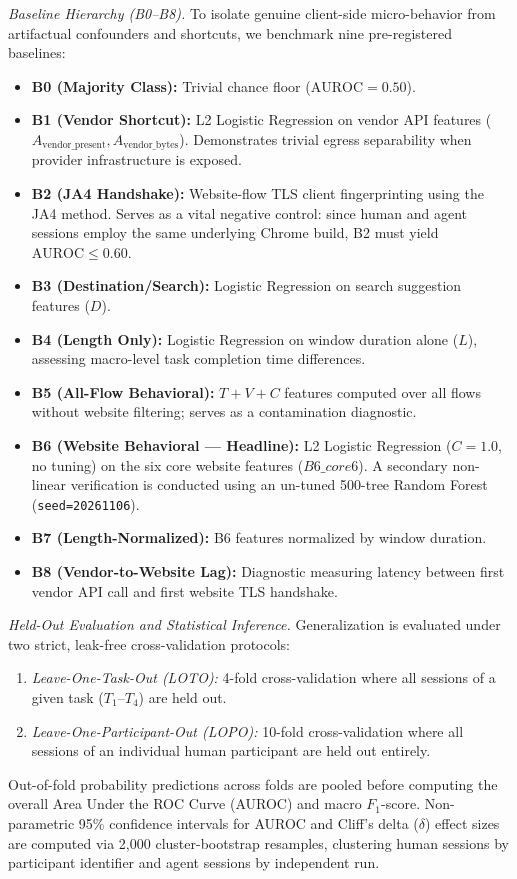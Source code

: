 \textit{Baseline Hierarchy (B0--B8).}
To isolate genuine client-side micro-behavior from artifactual confounders and shortcuts, we benchmark nine pre-registered baselines:
\begin{itemize}
    \item \textbf{B0 (Majority Class):} Trivial chance floor ($\text{AUROC} = 0.50$).
    \item \textbf{B1 (Vendor Shortcut):} L2 Logistic Regression on vendor API features ($A_{\text{vendor\_present}}, A_{\text{vendor\_bytes}}$). Demonstrates trivial egress separability when provider infrastructure is exposed.
    \item \textbf{B2 (JA4 Handshake):} Website-flow TLS client fingerprinting using the JA4 method. Serves as a vital negative control: since human and agent sessions employ the same underlying Chrome build, B2 must yield $\text{AUROC} \le 0.60$.
    \item \textbf{B3 (Destination/Search):} Logistic Regression on search suggestion features ($D$).
    \item \textbf{B4 (Length Only):} Logistic Regression on window duration alone ($L$), assessing macro-level task completion time differences.
    \item \textbf{B5 (All-Flow Behavioral):} $T+V+C$ features computed over all flows without website filtering; serves as a contamination diagnostic.
    \item \textbf{B6 (Website Behavioral --- Headline):} L2 Logistic Regression ($C=1.0$, no tuning) on the six core website features ($B6\_core6$). A secondary non-linear verification is conducted using an un-tuned 500-tree Random Forest (\texttt{seed=20261106}).
    \item \textbf{B7 (Length-Normalized):} B6 features normalized by window duration.
    \item \textbf{B8 (Vendor-to-Website Lag):} Diagnostic measuring latency between first vendor API call and first website TLS handshake.
\end{itemize}

\textit{Held-Out Evaluation and Statistical Inference.}
Generalization is evaluated under two strict, leak-free cross-validation protocols:
\begin{enumerate}
    \item \textit{Leave-One-Task-Out (LOTO):} 4-fold cross-validation where all sessions of a given task ($T_1$--$T_4$) are held out.
    \item \textit{Leave-One-Participant-Out (LOPO):} 10-fold cross-validation where all sessions of an individual human participant are held out entirely.
\end{enumerate}
Out-of-fold probability predictions across folds are pooled before computing the overall Area Under the ROC Curve (AUROC) and macro $F_1$-score. Non-parametric 95\% confidence intervals for AUROC and Cliff's delta ($\delta$) effect sizes are computed via 2,000 cluster-bootstrap resamples, clustering human sessions by participant identifier and agent sessions by independent run.

